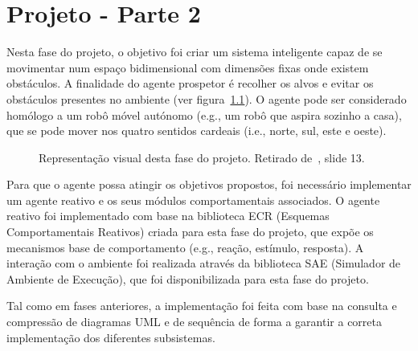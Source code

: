 \chapter{Projeto - Parte 2}\label{ch:projeto-parte2}

Nesta fase do projeto, o objetivo foi criar um sistema inteligente capaz de se movimentar num espaço bidimensional com dimensões fixas onde existem obstáculos.
A finalidade do agente prospetor é recolher os alvos e evitar os obstáculos presentes no ambiente (ver figura~\ref{fig:agente-prospetor}).
O agente pode ser considerado homólogo a um robô móvel autónomo (e.g., um robô que aspira sozinho a casa), que se pode mover nos quatro sentidos cardeais (i.e., norte, sul, este e oeste).

\begin{figure}[H]
    \begin{center}
    \end{center}
    \caption{Representação visual desta fase do projeto.
    Retirado de~\cite{isel:iasa:slides:arq-agentes-reativos-parte-2}, slide 13.}\label{fig:agente-prospetor}
\end{figure}

Para que o agente possa atingir os objetivos propostos, foi necessário implementar um agente reativo e os seus módulos comportamentais associados.
O agente reativo foi implementado com base na biblioteca ECR (Esquemas Comportamentais Reativos) criada para esta fase do projeto, que expõe os mecanismos base de comportamento (e.g., reação, estímulo, resposta).
A interação com o ambiente foi realizada através da biblioteca SAE (Simulador de Ambiente de Execução),
que foi disponibilizada para esta fase do projeto.

Tal como em fases anteriores, a implementação foi feita com base na consulta e compressão de diagramas UML e de sequência de forma a garantir a correta implementação dos diferentes subsistemas.


